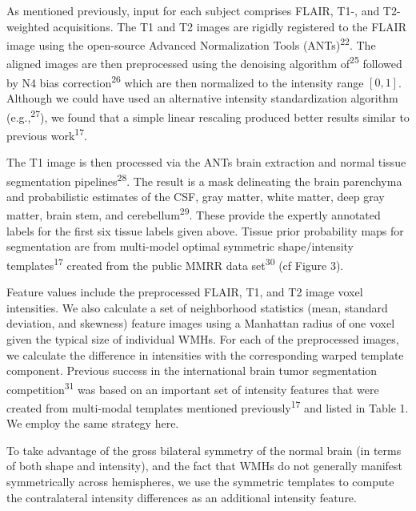 \documentclass[11pt,]{article}
\begin{document}
As mentioned previously, input for each subject comprises FLAIR, T1-,
and T2-weighted acquisitions. The T1 and T2 images are rigidly
registered to the FLAIR image using the open-source Advanced
Normalization Tools (ANTs)\textsuperscript{22}. The aligned images are
then preprocessed using the denoising algorithm of\textsuperscript{25}
followed by N4 bias correction\textsuperscript{26} which are then
normalized to the intensity range \([0,1]\). Although we could have used
an alternative intensity standardization algorithm
(e.g.,\textsuperscript{27}), we found that a simple linear rescaling
produced better results similar to previous work\textsuperscript{17}.

The T1 image is then processed via the ANTs brain extraction and normal
tissue segmentation pipelines\textsuperscript{28}. The result is a mask
delineating the brain parenchyma and probabilistic estimates of the CSF,
gray matter, white matter, deep gray matter, brain stem, and
cerebellum\textsuperscript{29}. These provide the expertly annotated
labels for the first six tissue labels given above. Tissue prior
probability maps for segmentation are from multi-model optimal symmetric
shape/intensity templates\textsuperscript{17} created from the public
MMRR data set\textsuperscript{30} (cf Figure 3).

Feature values include the preprocessed FLAIR, T1, and T2 image voxel
intensities. We also calculate a set of neighborhood statistics (mean,
standard deviation, and skewness) feature images using a Manhattan
radius of one voxel given the typical size of individual WMHs. For each
of the preprocessed images, we calculate the difference in intensities
with the corresponding warped template component. Previous success in
the international brain tumor segmentation
competition\textsuperscript{31} was based on an important set of
intensity features that were created from multi-modal templates
mentioned previously\textsuperscript{17} and listed in Table 1. We
employ the same strategy here.

To take advantage of the gross bilateral symmetry of the normal brain
(in terms of both shape and intensity), and the fact that WMHs do not
generally manifest symmetrically across hemispheres, we use the
symmetric templates to compute the contralateral intensity differences
as an additional intensity feature.
\end{document}
